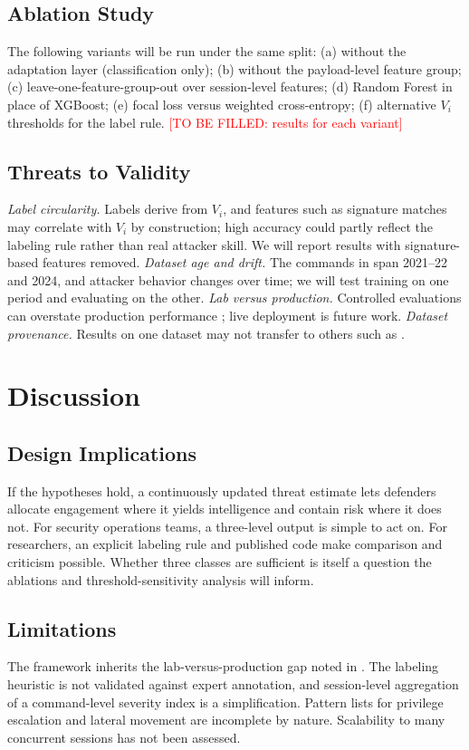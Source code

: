 \documentclass[conference]{IEEEtran}
\newcommand{\tbf}[1]{\textcolor{red}{[TO BE FILLED: #1]}}
\begin{document}
\subsection{Ablation Study}\label{sec:ablation}
The following variants will be run under the same split: (a) without the adaptation layer (classification only); (b) without the payload-level feature group; (c) leave-one-feature-group-out over session-level features; (d) Random Forest in place of XGBoost; (e) focal loss versus weighted cross-entropy; (f) alternative $V_i$ thresholds for the label rule. \tbf{results for each variant}

\subsection{Threats to Validity}\label{sec:validity}
\emph{Label circularity.} Labels derive from $V_i$, and features such as signature matches may correlate with $V_i$ by construction; high accuracy could partly reflect the labeling rule rather than real attacker skill. We will report results with signature-based features removed. \emph{Dataset age and drift.} The commands in \cite{ref10} span 2021--22 and 2024, and attacker behavior changes over time; we will test training on one period and evaluating on the other. \emph{Lab versus production.} Controlled evaluations can overstate production performance \cite{ref1}; live deployment is future work. \emph{Dataset provenance.} Results on one dataset may not transfer to others such as \cite{ref11}.

\section{Discussion}\label{sec:disc}
\subsection{Design Implications}
If the hypotheses hold, a continuously updated threat estimate lets defenders allocate engagement where it yields intelligence and contain risk where it does not. For security operations teams, a three-level output is simple to act on. For researchers, an explicit labeling rule and published code make comparison and criticism possible. Whether three classes are sufficient is itself a question the ablations and threshold-sensitivity analysis will inform.

\subsection{Limitations}
The framework inherits the lab-versus-production gap noted in \cite{ref1}. The labeling heuristic is not validated against expert annotation, and session-level aggregation of a command-level severity index is a simplification. Pattern lists for privilege escalation and lateral movement are incomplete by nature. Scalability to many concurrent sessions has not been assessed.
\end{document}
